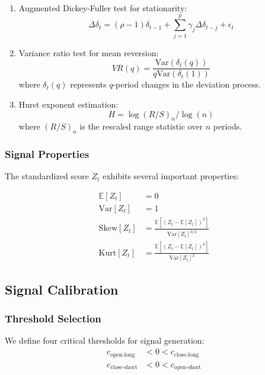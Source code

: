 \begin{enumerate}
    \item Augmented Dickey-Fuller test for stationarity:
    \begin{equation}
        \Delta \delta_t = (\rho-1)\delta_{t-1} + \sum_{j=1}^p \gamma_j \Delta \delta_{t-j} + \epsilon_t
    \end{equation}
    
    \item Variance ratio test for mean reversion:
    \begin{equation}
        VR(q) = \frac{\text{Var}(\delta_t(q))}{q\text{Var}(\delta_t(1))}
    \end{equation}
    where $\delta_t(q)$ represents $q$-period changes in the deviation process.
    
    \item Hurst exponent estimation:
    \begin{equation}
        H = \log(R/S)_n/\log(n)
    \end{equation}
    where $(R/S)_n$ is the rescaled range statistic over $n$ periods.
\end{enumerate}

\subsubsection{Signal Properties}
The standardized score $Z_t$ exhibits several important properties:

\begin{equation}
\begin{aligned}
    \mathbb{E}[Z_t] &= 0 \\
    \text{Var}[Z_t] &= 1 \\
    \text{Skew}[Z_t] &= \frac{\mathbb{E}[(Z_t - \mathbb{E}[Z_t])^3]}{\text{Var}[Z_t]^{3/2}} \\
    \text{Kurt}[Z_t] &= \frac{\mathbb{E}[(Z_t - \mathbb{E}[Z_t])^4]}{\text{Var}[Z_t]^2}
\end{aligned}
\end{equation}

\subsection{Signal Calibration}

\subsubsection{Threshold Selection}
We define four critical thresholds for signal generation:
\begin{equation}
\begin{aligned}
    c_{\text{open-long}} &< 0 < c_{\text{close-long}} \\
    c_{\text{close-short}} &< 0 < c_{\text{open-short}}
\end{aligned}
\end{equation}

